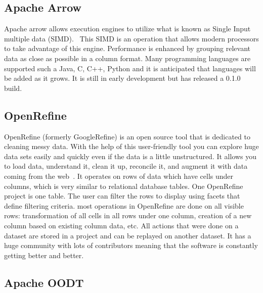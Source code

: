 {\subsection{Apache Arrow \cv}
     
Apache arrow allows execution engines to utilize what is known as
Single Input multiple data (SIMD).~\cite{www-arrow} This SIMD is an
operation that allows modern processors to take advantage of this
engine.  Performance is enhanced by grouping relevant data as close as
possible in a column format.  Many programming languages are supported
such a Java, C, C++, Python and it is anticipated that languages will
be added as it grows.  It is still in early development but has
released a 0.1.0 build.

\subsection{OpenRefine}

OpenRefine (formerly GoogleRefine) is an open source tool that is
dedicated to cleaning messy data. With the help of this user-friendly
tool you can explore huge data sets easily and quickly even if the
data is a little unstructured. It allows you to load data, understand
it, clean it up, reconcile it, and augment it with data coming from
the web~\cite{www-openrefine}. It operates on rows of data which have
cells under columns, which is very similar to relational database
tables. One OpenRefine project is one table. The user can filter the
rows to display using facets that define filtering criteria. most
operations in OpenRefine are done on all visible rows: transformation
of all cells in all rows under one column, creation of a new column
based on existing column data, etc. All actions that were done on a
dataset are stored in a project and can be replayed on another
dataset. It has a huge community with lots of contributors meaning
that the software is constantly getting better and better.

\subsection{Apache OODT \cv}

}
